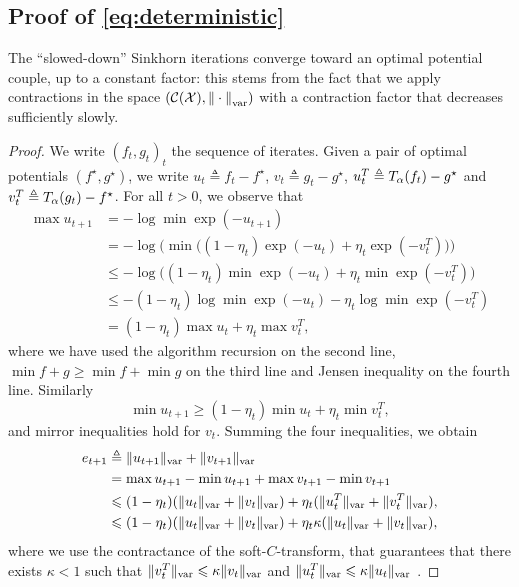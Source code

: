 \subsection{Proof of \autoref{eq:deterministic}}

The \enquote{slowed-down} Sinkhorn iterations converge toward an optimal
potential couple, up to a constant factor: this stems from the fact that we
apply contractions in the space $(\mathcal{C}(\mathcal{X}), {\Vert\cdot\Vert}_{\text{\upshape var}})$ with a
contraction factor that decreases sufficiently slowly.

\begin{proof}
    We write ${(f_t, g_t)}_t$ the sequence of iterates. Given a pair of optimal potentials 
    $(f^\star, g^\star)$, we write $u_t \triangleq f_t - f^\star$, $v_t \triangleq g_t - g^\star$,
    $u_t^T \triangleq T_{\alpha}(f_t) - g^\star$ and $v_t^T \triangleq T_{\alpha}(g_t) - f^\star$.
    For all $t > 0$, we observe that 
    \begin{align}
        \max u_{t+1} &= - \log \min \exp(-u_{t+1}) \\
        &= - \log \big( \min \big( (1 - \eta_t) \exp(-u_{t}) + \eta_t 
        \exp(-v_t^T) \big) \big)\\
        &\leq - \log \big( (1 - \eta_t) \min \exp(-u_{t}) + \eta_t 
        \min \exp(-v_t^T) \big)\\
        &\leq - (1 - \eta_t) \log \min \exp(-u_{t}) -  \eta_t \log \min
         \exp(-v_t^T) \\
         &= (1 - \eta_t) \max u_t  + \eta_t \max v_t^T,
    \end{align}
    where we have used the algorithm recursion on the second line, $\min f + g \geq \min f + \min g$
     on the third line and Jensen inequality on the fourth line. Similarly
    \begin{equation}
        \min u_{t+1} \geq (1 - \eta_t) \min u_t  + \eta_t \min v_t^T,
    \end{equation}
    and mirror inequalities hold for $v_t$. Summing the four inequalities, we obtain
    \begin{align}\label{eq:et}
        e_{t+1} &\triangleq \Vert u_{t+1} \Vert_{\text{\upshape var}} + \Vert v_{t+1} \Vert_{\text{\upshape var}} \\ 
        &= \max u_{t+1} - \min u_{t+1} + \max v_{t+1} - \min v_{t+1} \\
        &\leqslant
        (1 - \eta_t) ( \Vert u_t \Vert_{\text{\upshape var}} + \Vert v_t \Vert_{\text{\upshape var}})
        + \eta_t ( \Vert u_t^T \Vert_{\text{\upshape var}} + \Vert v_t^T \Vert_{\text{\upshape var}}), \\
        &\leqslant
        (1 - \eta_t) ( \Vert u_t \Vert_{\text{\upshape var}} + \Vert v_t \Vert_{\text{\upshape var}})
        + \eta_t \kappa ( \Vert u_t \Vert_{\text{\upshape var}} + \Vert v_t \Vert_{\text{\upshape var}}),
    \end{align}
    where we use the contractance of the soft-$C$-transform, that guarantees that
    there exists $\kappa < 1$ such that $\Vert v_t^T\Vert_{\text{\upshape var}} \leqslant \kappa \Vert
    v_t\Vert_{\text{\upshape var}}$ and $\Vert u_t^T\Vert_{\text{\upshape var}} \leqslant \kappa \Vert
    u_t\Vert_{\text{\upshape var}}$ \citep{peyre2019computational}.


\end{proof}
